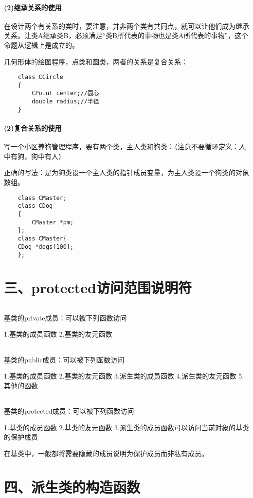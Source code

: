 \documentclass{article}
\begin{document}
\begin{CJK}{UTF8}{gbsn}
\subsection*{(2)继承关系的使用}
\subparagraph*{}
在设计两个有关系的类时，要注意，并非两个类有共同点，就可以让他们成为继承关系。让类A继承类B，必须满足“类B所代表的事物也是类A所代表的事物”，这个命题从逻辑上是成立的。
\subparagraph*{}
几何形体的绘图程序，点类和圆类，两者的关系是复合关系：
\begin{verbatim}
    class CCircle
    {
        CPoint center;//圆心
        double radius;//半径
    }
\end{verbatim}
\subsection*{(2)复合关系的使用}
\subparagraph*{}
写一个小区养狗管理程序，要有两个类，主人类和狗类：（注意不要循环定义：人中有狗，狗中有人）
\subparagraph*{}
正确的写法：是为狗类设一个主人类的指针成员变量，为主人类设一个狗类的对象数组。
\begin{verbatim}
    class CMaster;
    class CDog
    {
        CMaster *pm;
    };
    class CMaster{
    CDog *dogs[100];
    };
\end{verbatim}
\part*{三、protected访问范围说明符}
\paragraph*{}
基类的private成员：可以被下列函数访问
\subparagraph*{}
1.基类的成员函数
2.基类的友元函数
\paragraph*{}
基类的public成员：可以被下列函数访问
\subparagraph*{}
1.基类的成员函数
2.基类的友元函数
3.派生类的成员函数
4.派生类的友元函数
5.其他的函数
\paragraph*{}
基类的protected成员：可以被下列函数访问
\subparagraph*{}
1.基类的成员函数
2.基类的友元函数
3.派生类的成员函数可以访问当前对象的基类的保护成员
\subparagraph*{}
在基类中，一般都将需要隐藏的成员说明为保护成员而非私有成员。
\part*{四、派生类的构造函数}

\end{CJK}
\end{document}
